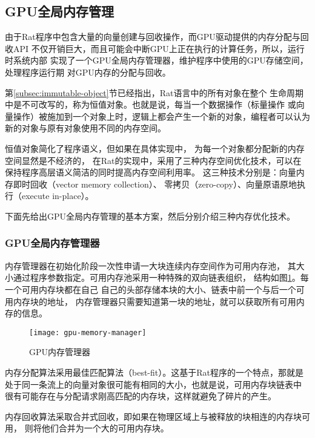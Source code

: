 \subsection{GPU全局内存管理}
由于Rat程序中包含大量的向量创建与回收操作，而GPU驱动提供的内存分配与回收API
不仅开销巨大，而且可能会中断GPU上正在执行的计算任务，所以，运行时系统内部
实现了一个GPU全局内存管理器，维护程序中使用的GPU存储空间，处理程序运行期
对GPU内存的分配与回收。

第\ref{subsec:immutable-object}节已经指出，Rat语言中的所有对象在整个
生命周期中是不可改写的，称为恒值对象。也就是说，每当一个数据操作（标量操作
或向量操作）被施加到一个对象上时，逻辑上都会产生一个新的对象，编程者可以认为
新的对象与原有对象使用不同的内存空间。

恒值对象简化了程序语义，但如果在具体实现中，
为每一个对象都分配新的内存空间显然是不经济的，
在Rat的实现中，采用了三种内存空间优化技术，可以在
保持程序高层语义简洁的同时提高内存空间利用率。
这三种技术分别是：向量内存即时回收（vector memory collection）、
零拷贝（zero-copy）、向量原语原地执行（execute in-place）。

下面先给出GPU全局内存管理的基本方案，然后分别介绍三种内存优化技术。

\subsubsection{GPU全局内存管理器}
内存管理器在初始化阶段一次性申请一大块连续内存空间作为可用内存池，
其大小通过程序参数指定。可用内存池采用一种特殊的双向链表组织，
结构如图\ref{fig:gpu-memory-manager}。每一个可用内存块都在自己
自己的头部存储本块的大小、链表中前一个与后一个可用内存块的地址，
内存管理器只需要知道第一块的地址，就可以获取所有可用内存的信息。
\begin{figure}
  \centering
  \texttt{[image: gpu-memory-manager]}
  \caption{GPU内存管理器}
  \label{fig:gpu-memory-manager}
\end{figure}

内存分配算法采用最佳匹配算法（best-fit）。这基于Rat程序的一个特点，那就是
处于同一条流上的向量对象很可能有相同的大小，也就是说，可用内存块链表中
很有可能存在与分配请求刚高匹配的内存块，这样就避免了碎片的产生。

内存回收算法采取合并式回收，即如果在物理区域上与被释放的块相连的内存块可用，
则将他们合并为一个大的可用内存块。

